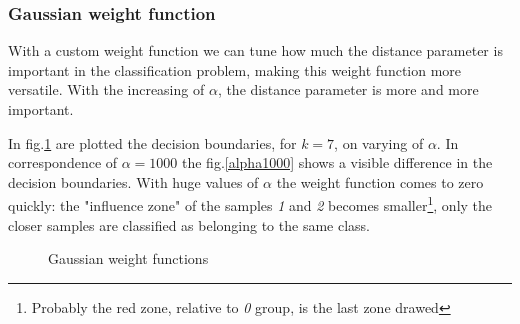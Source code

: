 \documentclass[10pt,a4paper]{article}
\begin{document}
		\subsubsection*{Gaussian weight function}
		With a custom weight function we can tune how much the distance parameter is important in the classification problem, making this weight function more versatile. With the increasing of $\alpha$, the distance parameter is more and more important.
		
		In fig.\ref{gaussian} are plotted the decision boundaries, for $k=7$, on varying of $\alpha$. In correspondence of $\alpha=1000$ the fig.\ref{alpha1000} shows a visible difference in the decision boundaries. With huge values of $\alpha$ the weight function comes to zero quickly: the "influence zone" of the samples \emph{1} and \emph{2} becomes smaller\footnote{Probably the red zone, relative to \emph{0} group, is the last zone drawed}, only the closer samples are classified as belonging to the same class.
		
		\begin{figure}[!h]
			\centering
			\qquad\qquad
			\qquad\qquad
			\qquad\qquad
			\caption{Gaussian weight functions\label{gaussian}}
		\end{figure}
		
\end{document}
